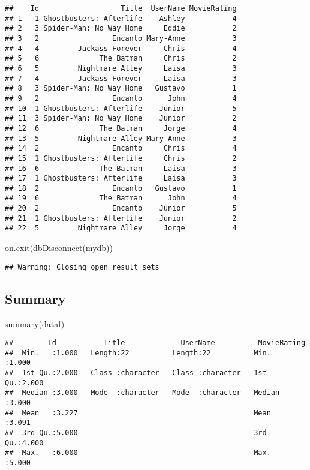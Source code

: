 \documentclass[
]{article}
\newenvironment{Shaded}{\begin{snugshade}}{\end{snugshade}}
\newcommand{\FunctionTok}[1]{\textcolor[rgb]{0.00,0.00,0.00}{#1}}
\newcommand{\NormalTok}[1]{#1}
\begin{document}
\begin{verbatim}
##    Id                   Title  UserName MovieRating
## 1   1 Ghostbusters: Afterlife    Ashley           4
## 2   3 Spider-Man: No Way Home     Eddie           2
## 3   2                 Encanto Mary-Anne           3
## 4   4         Jackass Forever     Chris           4
## 5   6              The Batman     Chris           2
## 6   5         Nightmare Alley     Laisa           3
## 7   4         Jackass Forever     Laisa           3
## 8   3 Spider-Man: No Way Home   Gustavo           1
## 9   2                 Encanto      John           4
## 10  1 Ghostbusters: Afterlife    Junior           5
## 11  3 Spider-Man: No Way Home    Junior           2
## 12  6              The Batman     Jorge           4
## 13  5         Nightmare Alley Mary-Anne           3
## 14  2                 Encanto     Chris           4
## 15  1 Ghostbusters: Afterlife     Chris           2
## 16  6              The Batman     Laisa           3
## 17  1 Ghostbusters: Afterlife     Laisa           3
## 18  2                 Encanto   Gustavo           1
## 19  6              The Batman      John           4
## 20  2                 Encanto    Junior           5
## 21  1 Ghostbusters: Afterlife    Junior           2
## 22  5         Nightmare Alley     Jorge           4
\end{verbatim}

\begin{Shaded}
\begin{Highlighting}[]
\FunctionTok{on.exit}\NormalTok{(}\FunctionTok{dbDisconnect}\NormalTok{(mydb))}
\end{Highlighting}
\end{Shaded}

\begin{verbatim}
## Warning: Closing open result sets
\end{verbatim}

\hypertarget{summary}{%
\subsection{Summary}\label{summary}}

\begin{Shaded}
\begin{Highlighting}[]
\FunctionTok{summary}\NormalTok{(dataf)}
\end{Highlighting}
\end{Shaded}

\begin{verbatim}
##        Id           Title             UserName          MovieRating   
##  Min.   :1.000   Length:22          Length:22          Min.   :1.000  
##  1st Qu.:2.000   Class :character   Class :character   1st Qu.:2.000  
##  Median :3.000   Mode  :character   Mode  :character   Median :3.000  
##  Mean   :3.227                                         Mean   :3.091  
##  3rd Qu.:5.000                                         3rd Qu.:4.000  
##  Max.   :6.000                                         Max.   :5.000
\end{verbatim}
\end{document}
